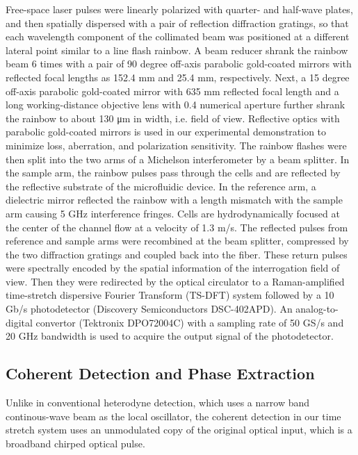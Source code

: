 \documentclass[aps,pra,preprint,superscriptaddress]{revtex4-1}
\begin{document}
Free-space laser pulses were linearly polarized with quarter- and half-wave plates, and then spatially dispersed with a pair of reflection diffraction gratings, so that each wavelength component of the collimated beam was positioned at a different lateral point similar to a line flash rainbow. A beam reducer shrank the rainbow beam 6 times with a pair of 90 degree off-axis parabolic gold-coated mirrors with reflected focal lengths as 152.4 mm and 25.4 mm, respectively. Next, a 15 degree off-axis parabolic gold-coated mirror with 635 mm reflected focal length and a long working-distance objective lens with 0.4 numerical aperture further shrank the rainbow to about 130 μm in width, i.e. field of view. Reflective optics with parabolic gold-coated mirrors is used in our experimental demonstration to minimize loss, aberration, and polarization sensitivity. The rainbow flashes were then split into the two arms of a Michelson interferometer by a beam splitter. In the sample arm, the rainbow pulses pass through the cells and are reflected by the reflective substrate of the microfluidic device. In the reference arm, a dielectric mirror reflected the rainbow with a length mismatch with the sample arm causing 5 GHz interference fringes. Cells are hydrodynamically focused at the center of the channel flow at a velocity of 1.3 m/s. The reflected pulses from reference and sample arms were recombined at the beam splitter, compressed by the two diffraction gratings and coupled back into the fiber. These return pulses were spectrally encoded by the spatial information of the interrogation field of view. Then they were redirected by the optical circulator to a Raman-amplified time-stretch dispersive Fourier Transform (TS-DFT) system followed by a 10 Gb/s photodetector (Discovery Semiconductors DSC-402APD). An analog-to-digital convertor (Tektronix DPO72004C) with a sampling rate of 50 GS/s and 20 GHz bandwidth is used to acquire the output signal of the photodetector.

\subsection{Coherent Detection and Phase Extraction}

Unlike in conventional heterodyne detection, which uses a narrow band continous-wave beam as the local oscillator, the coherent detection in our time stretch system uses an unmodulated copy of the original optical input, which is a broadband chirped optical pulse. 
\end{document}
